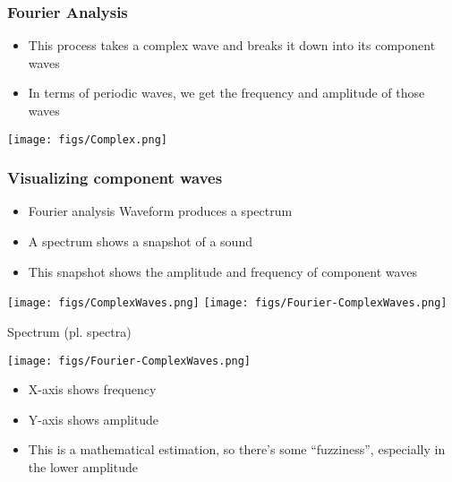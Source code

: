 \documentclass[professionalfonts]{beamer}
\begin{document}
\begin{frame}
    \frametitle{Fourier Analysis}

    \begin{multicols}{2}
        \begin{itemize}
            \item This process takes a complex wave and breaks it down into its component waves
            \item In terms of periodic waves, we get the frequency and amplitude of those waves
        \end{itemize}

        \columnbreak

        \texttt{[image: figs/Complex.png]}
    \end{multicols}
\end{frame}

\begin{frame}
    \frametitle{Visualizing component waves}
    \begin{multicols}{2}
        \begin{itemize}
            \item Fourier analysis Waveform produces a spectrum
            \item A spectrum shows a snapshot of a sound
            \item This snapshot shows the amplitude and frequency of component waves
        \end{itemize}
        
        \columnbreak

        \texttt{[image: figs/ComplexWaves.png]}
        \texttt{[image: figs/Fourier-ComplexWaves.png]}
    \end{multicols}
\end{frame}

\begin{frame}{Spectrum (pl. spectra)}
    \begin{multicols}{2}
        \texttt{[image: figs/Fourier-ComplexWaves.png]}
        \columnbreak

        \begin{itemize}
            \item X-axis shows frequency
            \item Y-axis shows amplitude
            \item This is a mathematical estimation, so there’s some “fuzziness”, especially in the lower amplitude
        \end{itemize}
    \end{multicols}
\end{frame}
\end{document}
